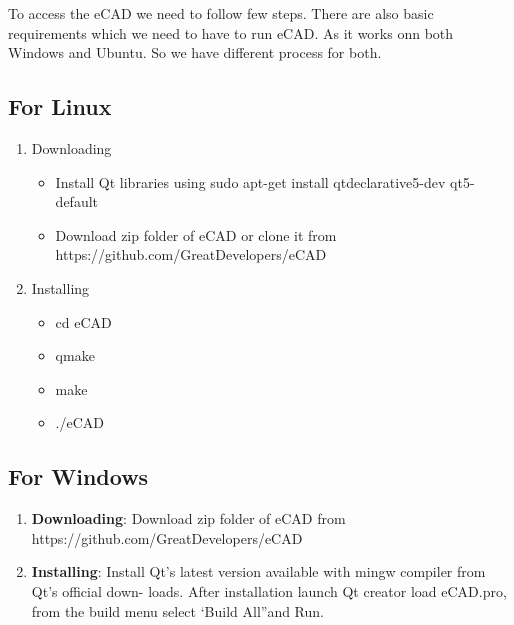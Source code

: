 To access the eCAD we need to follow few steps. There are also basic requirements which
we need to have to run eCAD. As it works onn both Windows and Ubuntu. So we have
diﬀerent process for both.
\subsection{For Linux}
\begin{enumerate}
\item Downloading
\begin{itemize}
\item Install Qt libraries using sudo apt-get install qtdeclarative5-dev qt5-default
\item Download zip folder of eCAD or clone it from https://github.com/GreatDevelopers/eCAD
\end{itemize}
\item Installing
\begin{itemize}
\item cd eCAD
\item qmake
\item make
\item ./eCAD
\end{itemize}
\end{enumerate}

\subsection{For Windows}
\begin{enumerate}
\item \textbf{Downloading}: Download zip folder of eCAD from https://github.com/GreatDevelopers/eCAD
\item \textbf{Installing}:  Install Qt’s latest version available with mingw compiler from Qt’s official down-
loads. After installation launch Qt creator load eCAD.pro, from the build menu select
‘Build All”and Run.
\end{enumerate}

